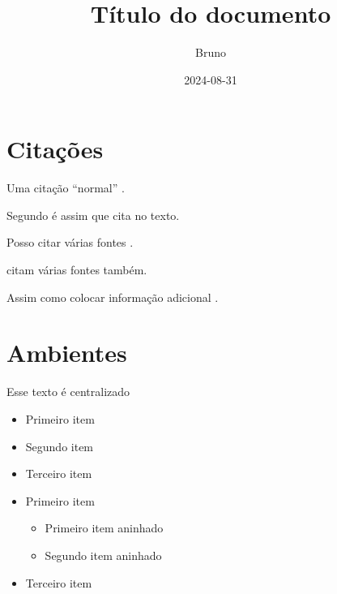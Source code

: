 \documentclass[dsc,male,12pt,a4paper]{ita}
\title{Título do documento}
\author{Bruno}
\date{2024-08-31}
\begin{document}
\frontmatter
\maketitle
\makecip

\tableofcontents

\mainmatter
\chapter{Citações}
Uma citação ``normal'' \cite{silvaBIM4DNo2019}.

Segundo \textcite{dynamoDynamoBIM} é assim que cita no texto.

Posso citar várias fontes \cites{nrelEnergyPlus2024,ronzaniEstudoITAPara2020}.

\textcites{wenProgressTrendBIM2021,autodeskNavisworks3DModel2024} citam várias fontes também.

Assim como colocar informação adicional \cite[pre][post]{pauwelsIFCtoRDF2024}.

\chapter{Ambientes}

\begin{center}
	Esse texto é centralizado
\end{center}


\begin{itemize}
	\item Primeiro item
	\item Segundo item
	\item Terceiro item
\end{itemize}

\begin{itemize}
	\item Primeiro item
	      \begin{itemize}
		      \item Primeiro item aninhado
		      \item Segundo item aninhado
	      \end{itemize}
	\item Terceiro item
\end{itemize}
\end{document}

